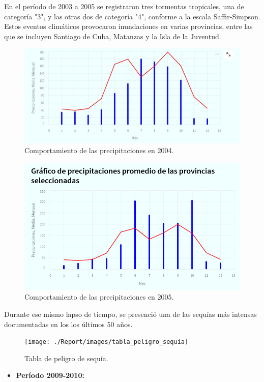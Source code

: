 \documentclass[12pt]{article}
\begin{document}
	En el período de 2003 a 2005 se registraron tres tormentas tropicales, una de categoría "3", y las otras dos de categoría "4", conforme a la escala Saffir-Simpson. Estos eventos climáticos provocaron inundaciones en varias provincias, entre las que se incluyen Santiago de Cuba, Matanzas y la Isla de la Juventud.\cite{webpage4}
	
	
	\begin{figure}[H]
		\centering
		\includegraphics[width=0.7\linewidth]{./Report/images/precipitaciones_2004}
		\caption{Comportamiento de las precipitaciones en 2004.}
		\label{fig:precipitaciones2004}
	\end{figure}
	
	
	\begin{figure}[H]
		\centering
		\includegraphics[width=0.7\linewidth]{./Report/images/precipitaciones_2005}
		\caption{Comportamiento de las precipitaciones en 2005.}
		\label{fig:precipitaciones2005}
	\end{figure}
	
	Durante ese mismo lapso de tiempo, se presenció  una de las sequías más intensas  documentadas en los los últimos 50 años.\cite{webpage5}
	
	
	\begin{figure}[H]
		\centering
		\texttt{[image: ./Report/images/tabla\_peligro\_sequía]}
		\caption{Tabla de peligro de sequía.}
		\label{fig:tablapeligrosequia}
	\end{figure}
	
	\begin{itemize}
		\item\textbf{Período 2009-2010:}
	\end{itemize}
	
\end{document}
